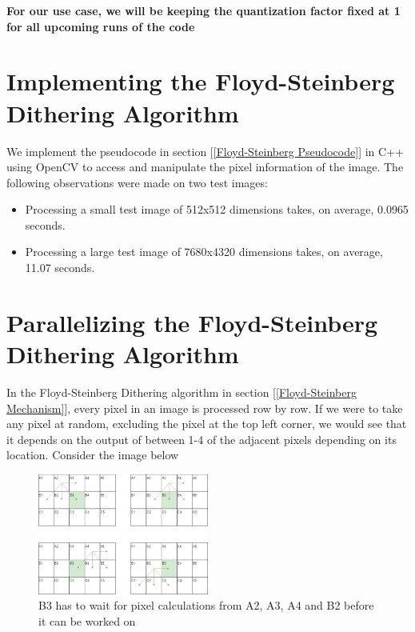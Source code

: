 \documentclass{article}
\begin{document}
\noindent \textbf{For our use case, we will be keeping the quantization factor fixed at 1 for all upcoming runs of the code}

\section{Implementing the Floyd-Steinberg Dithering Algorithm}\label{Implementing Floyd-Steinberg Dithering}

We implement the pseudocode in section [\ref{Floyd-Steinberg Pseudocode}] in C++ using OpenCV to access and manipulate the pixel information of the image. The following observations were made on two test images:

\begin{itemize}
    \item Processing a small test image of 512x512 dimensions takes, on average, 0.0965 seconds.

    \item Processing a large test image of 7680x4320 dimensions takes, on average, 11.07 seconds.
\end{itemize}

\section{Parallelizing the Floyd-Steinberg Dithering Algorithm}

\medskip
\noindent In the Floyd-Steinberg Dithering algorithm in section [\ref{Floyd-Steinberg Mechanism}], every pixel in an image is processed row by row. If we were to take any pixel at random, excluding the pixel at the top left corner, we would see that it depends on the output of between 1-4 of the adjacent pixels depending on its location. Consider the image below\cite{Hartley}

\begin{figure}[H]
    \centering
    \includegraphics[width=0.5\textwidth]{images/Floyd_process.png}
    \caption{B3 has to wait for pixel calculations from A2, A3, A4 and B2 before it can be worked on}
    \label{fig:process_sketch}
\end{figure}
\end{document}
